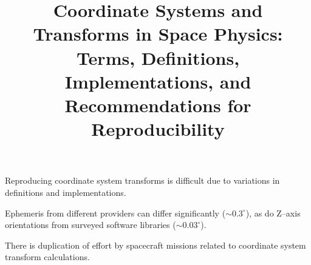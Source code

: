 \documentclass[draft]{agujournal2019}
\begin{document}
\title{Coordinate Systems and Transforms in Space Physics: Terms, Definitions, Implementations, and Recommendations for Reproducibility}









\noindent



\begin{keypoints}
\item Reproducing coordinate system transforms is difficult due to variations in definitions and implementations.
\item Ephemeris from different providers can differ significantly (${\sim}0.3^\circ$), as do Z--axis orientations from surveyed software libraries (${\sim}0.03^\circ$).
\item There is duplication of effort by spacecraft missions related to coordinate system transform calculations.
\end{keypoints}
\end{document}
